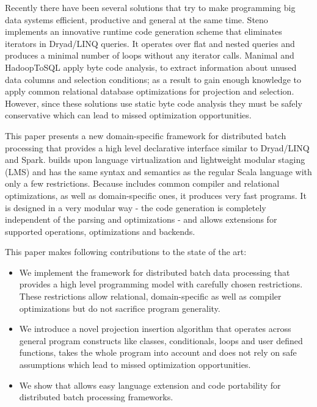 Recently there have been several solutions that try to make programming
big data systems efficient, productive and general at the same time. Steno
\cite{murray_steno:_2011} implements an innovative runtime code generation
scheme that eliminates iterators in Dryad/LINQ queries. It operates over flat
and nested queries and produces a minimal number of loops without any iterator
calls. Manimal \cite{jahani_automatic_2011} and HadoopToSQL
\cite{iu_hadooptosql:_2010} apply byte code analysis, to extract information
about unused data columns and selection conditions; as a result to gain enough
knowledge to apply common relational database optimizations for projection and
selection. However, since these solutions use static byte code analysis they
must be safely conservative which can lead to missed optimization opportunities.

This paper presents a new domain-specific framework \tool for distributed batch
processing that provides a high level declarative interface similar to
Dryad/LINQ and Spark. \tool builds upon language virtualization
\cite{moors_scala-virtualized_2012} and lightweight modular staging
\cite{rompf_lightweight_2010} (LMS) and has the same syntax and semantics as the
regular Scala language with only a few restrictions.
Because \tool includes common compiler and relational optimizations, as well as
domain-specific ones, it produces very fast programs. It is designed in a very
modular way - the code generation is completely independent of the parsing and
optimizations - and allows extensions for supported operations, optimizations
and backends.

This paper makes following contributions to the state of the art:    
\begin{itemize}

  \item We implement the \tool framework for distributed batch data
  processing that provides a high level programming model with carefully chosen
  restrictions. These restrictions allow relational, domain-specific as well as
  compiler optimizations but do not sacrifice program generality.

  \item We introduce a novel projection insertion algorithm that operates across
  general program constructs like classes, conditionals, loops and user defined
  functions, takes the whole program into account and does not rely on safe
  assumptions which lead to missed optimization opportunities.

  \item We show that \tool allows easy language extension and code portability
  for distributed batch processing frameworks.

\end{itemize} 

